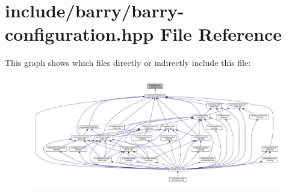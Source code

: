 \hypertarget{barry-configuration_8hpp}{}\section{include/barry/barry-\/configuration.hpp File Reference}
\label{barry-configuration_8hpp}
This graph shows which files directly or indirectly include this file\+:
\nopagebreak
\begin{figure}[H]
\begin{center}
\leavevmode
\includegraphics[width=350pt]{barry-configuration_8hpp__dep__incl}
\end{center}
\end{figure}
